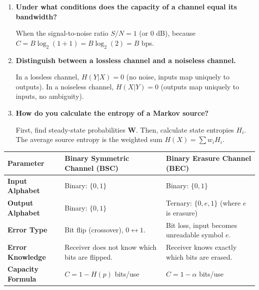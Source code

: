 \documentclass[12pt,a4paper]{article}
\newcommand{\Q}[1]{\textbf{#1}\par\noindent\ignorespaces}
\renewcommand{\arraystretch}{1.45}
\begin{document}
\begin{tcolorbox}[exambox, title={\textbf{Frequently Asked / Viva Questions}}]
\begin{enumerate}[topsep=0pt, label=\textbf{Q\arabic*.}, itemsep=5pt]
  \item \Q{Under what conditions does the capacity of a channel equal its bandwidth?}
    When the signal-to-noise ratio $S/N = 1$ (or $0 \text{ dB}$), because $C = B \log_2(1+1) = B \log_2(2) = B$ bps.
  \item \Q{Distinguish between a lossless channel and a noiseless channel.}
    In a lossless channel, $H(Y|X) = 0$ (no noise, inputs map uniquely to outputs). In a noiseless channel, $H(X|Y) = 0$ (outputs map uniquely to inputs, no ambiguity).
  \item \Q{How do you calculate the entropy of a Markov source?}
    First, find steady-state probabilities $\mathbf{W}$. Then, calculate state entropies $H_i$. The average source entropy is the weighted sum $H(X) = \sum w_i H_i$.
\end{enumerate}
\end{tcolorbox}

\begin{tcolorbox}[tikzbox, title={Comparison of BSC and BEC Models}]
\renewcommand{\arraystretch}{1.45}
\par\noindent
\begin{tabularx}{\linewidth}{|B{3.2cm}|Y|Y|}
\hline
\textbf{Parameter} & \textbf{\color{myteal}Binary Symmetric Channel (BSC)} & \textbf{\color{mygreen}Binary Erasure Channel (BEC)} \\
\hline
\textbf{Input Alphabet} & Binary: $\{0, 1\}$ & Binary: $\{0, 1\}$ \\
\hline
\textbf{Output Alphabet} & Binary: $\{0, 1\}$ & Ternary: $\{0, e, 1\}$ (where $e$ is erasure) \\
\hline
\textbf{Error Type} & Bit flip (crossover), $0 \leftrightarrow 1$. & Bit loss, input becomes unreadable symbol $e$. \\
\hline
\textbf{Error Knowledge} & Receiver does not know which bits are flipped. & Receiver knows exactly which bits are erased. \\
\hline
\textbf{Capacity Formula} & $C = 1 - H(p)$ bits/use & $C = 1 - \alpha$ bits/use \\
\hline
\end{tabularx}
\end{tcolorbox}
\end{document}
